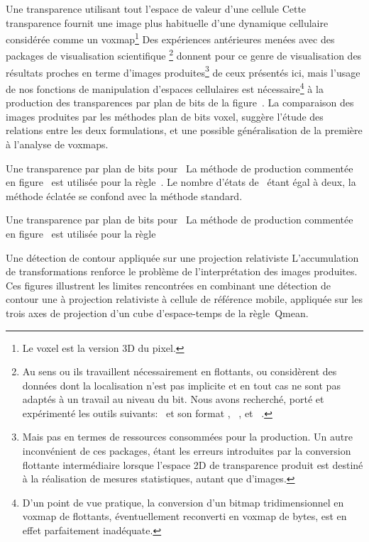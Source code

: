 %
{}%
{Une transparence utilisant tout l'espace de valeur d'une cellule}%
{Cette transparence fournit une image plus habituelle d'une
  dynamique cellulaire considérée comme un voxmap\footnote{%
    Le voxel est la version 3D du pixel.} %
  Des expériences antérieures menées avec des packages de visualisation
  scientifique \footnote{%
    Au sens ou ils travaillent nécessairement en flottants, ou considèrent
    des données dont la localisation n'est pas implicite
    et en tout cas ne sont pas adaptés à un travail au niveau du bit. %
    Nous avons recherché, porté et expérimenté les outils suivants:~%
     et son format %
    , %
    ~\cite[]{Hibbard94}, %
     et %
    ~\cite[]{Cabral93}.} %
  donnent pour ce genre de visualisation des résultats proches en terme
  d'images produites\footnote{%
    Mais pas en termes de ressources consommées pour la production. %
    Un autre inconvénient de ces packages, étant les erreurs
    introduites par la conversion flottante intermédiaire lorsque
    l'espace 2D de transparence produit est destiné à la réalisation
    de mesures statistiques, autant que d'images.} %
  de ceux présentés ici, %
  mais l'usage de nos fonc\-tions de manipulation d'espaces cellulaires
  est nécessaire\footnote{%
    D'un point de vue pratique, la conversion d'un bitmap
    tridimensionnel en voxmap de flottants, éventuellement reconverti
    en voxmap de bytes, est en effet parfaitement inadéquate.} %
  à la pro\-duc\-tion des transparences par plan de bits de
  la figure~. %
  La comparaison des images produites par les méthodes plan de bits
  \vs voxel, suggère l'étude des relations entre les deux
  formulations, et une possible généralisation de la première à
  l'analyse de voxmaps.} %

%
{}%
{Une transparence par plan de bits pour~}%
{La méthode de production commentée en
  figure~ est utilisée 
  pour la règle~. %
  Le nombre d'états de~ étant égal à deux, la méthode
  éclatée se confond avec la méthode standard.}

%
{}%
{Une transparence par plan de bits pour~}%
{La méthode de production commentée en
  figure~ est utilisée 
  pour la règle~}

%
{}%
{Une détection de contour appliquée sur une projection relativiste}%
{L'accumulation de transformations renforce le problème de
  l'interprétation des images produites. %
  Ces figures illustrent les limites rencontrées en combinant une
  détection de contour une à projection relativiste à cellule de
  référence mobile, appliquée sur les trois axes de projection d'un
  cube d'espace-temps de la règle~{Qmean}.}

